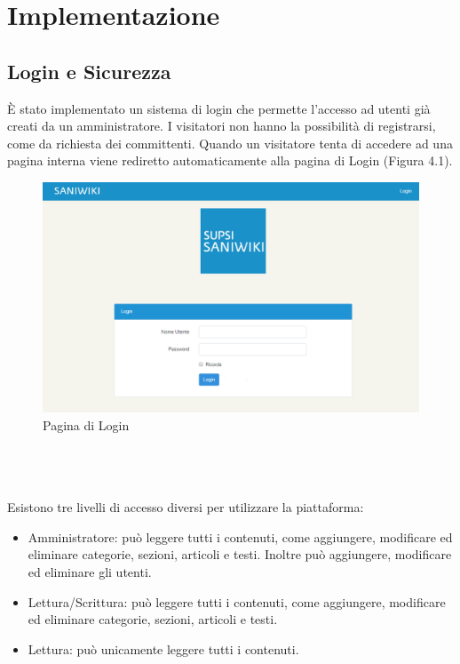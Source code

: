 \documentclass[twoside]{supsistudent}
\begin{document}
\chapter{Implementazione}

\section{Login e Sicurezza}
È stato implementato un sistema di login che permette l'accesso ad utenti già creati da un amministratore. I visitatori non hanno la possibilità di registrarsi, come da richiesta dei committenti. Quando un visitatore tenta di accedere ad una pagina interna viene rediretto automaticamente alla pagina di Login (Figura 4.1).
\begin{figure}[!h]
\centering
\includegraphics[scale=0.4]{saniwiki_login.png}
\caption{Pagina di Login}
\end{figure}
\\ \\ \\
Esistono tre livelli di accesso diversi per utilizzare la piattaforma:\\
\begin{itemize}
\item Amministratore: può leggere tutti i contenuti, come aggiungere, modificare ed eliminare categorie, sezioni, articoli e testi. Inoltre può aggiungere, modificare ed eliminare gli utenti.\\
\item Lettura/Scrittura: può leggere tutti i contenuti, come aggiungere, modificare ed eliminare categorie, sezioni, articoli e testi.\\
\item Lettura: può unicamente leggere tutti i contenuti.\\
\end{itemize}
\end{document}
